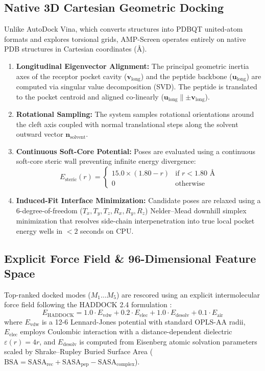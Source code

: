 \documentclass[10pt,twocolumn]{article}
\begin{document}
\subsection{Native 3D Cartesian Geometric Docking}
Unlike AutoDock Vina, which converts structures into PDBQT united-atom formats and explores torsional grids, AMP-Screen operates entirely on native PDB structures in Cartesian coordinates (\AA).
\begin{enumerate}
    \item \textbf{Longitudinal Eigenvector Alignment:} The principal geometric inertia axes of the receptor pocket cavity ($\mathbf{v}_{\text{long}}$) and the peptide backbone ($\mathbf{u}_{\text{long}}$) are computed via singular value decomposition (SVD). The peptide is translated to the pocket centroid and aligned co-linearly ($\mathbf{u}_{\text{long}} \parallel \pm \mathbf{v}_{\text{long}}$).
    \item \textbf{Rotational Sampling:} The system samples rotational orientations around the cleft axis coupled with normal translational steps along the solvent outward vector $\mathbf{n}_{\text{solvent}}$.
    \item \textbf{Continuous Soft-Core Potential:} Poses are evaluated using a continuous soft-core steric wall preventing infinite energy divergence:
    \begin{equation}
    E_{\text{steric}}(r) = \begin{cases} 
    15.0 \times (1.80 - r) & \text{if } r < 1.80\text{ \AA} \\
    0 & \text{otherwise}
    \end{cases}
    \end{equation}
    \item \textbf{Induced-Fit Interface Minimization:} Candidate poses are relaxed using a 6-degree-of-freedom ($T_x, T_y, T_z, R_x, R_y, R_z$) Nelder--Mead downhill simplex minimization that resolves side-chain interpenetration into true local pocket energy wells in $<2$ seconds on CPU.
\end{enumerate}

\subsection{Explicit Force Field \& 96-Dimensional Feature Space}
Top-ranked docked modes ($M_1 \dots M_5$) are rescored using an explicit intermolecular force field following the HADDOCK 2.4 formulation \cite{vanZundert2016}:
\begin{equation}
E_{\text{HADDOCK}} = 1.0 \cdot E_{\text{vdw}} + 0.2 \cdot E_{\text{elec}} + 1.0 \cdot E_{\text{desolv}} + 0.1 \cdot E_{\text{air}}
\end{equation}
where $E_{\text{vdw}}$ is a 12-6 Lennard-Jones potential with standard OPLS-AA radii, $E_{\text{elec}}$ employs Coulombic interaction with a distance-dependent dielectric $\varepsilon(r) = 4r$, and $E_{\text{desolv}}$ is computed from Eisenberg atomic solvation parameters scaled by Shrake--Rupley Buried Surface Area ($\text{BSA} = \text{SASA}_{\text{rec}} + \text{SASA}_{\text{pep}} - \text{SASA}_{\text{complex}}$).
\end{document}
